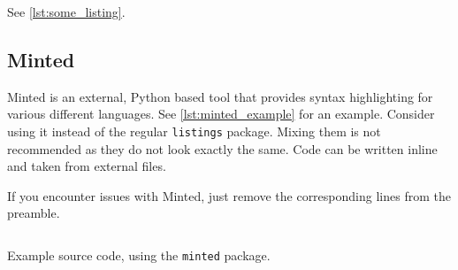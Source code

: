 See \cref{lst:some_listing}.



\subsection{Minted}

Minted is an external, Python based tool that provides syntax highlighting for various different languages.
See \cref{lst:minted_example} for an example.
Consider using it instead of the regular \texttt{listings} package.
Mixing them is not recommended as they do not look exactly the same.
Code can be written inline and taken from external files.

If you encounter issues with Minted, just remove the corresponding lines from the preamble.

\begin{listing}
	\capstart
	\inputminted{haskell}{code/sample.hs}
	\caption{Example source code, using the \texttt{minted} package.}
	\label{lst:minted_example}
\end{listing}

